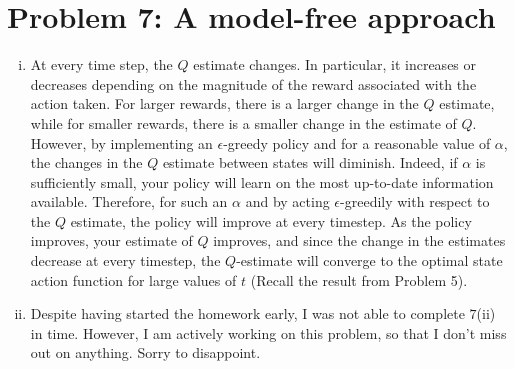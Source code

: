\documentclass[twoside,11pt]{homework}
\DeclarePairedDelimiter{\2norm}{\lVert}{\rVert^2_2}
\newcommand{\1}[1]{\mathds{1}\left[#1\right]}
\begin{document}
\section*{\large Problem 7: A model-free approach}
\begin{enumerate}[i)]
\item At every time step, the $Q$ estimate changes. In particular, it increases or decreases depending on the magnitude of the reward associated with the action taken. For larger rewards, there is a larger change in the $Q$ estimate, while for smaller rewards, there is a smaller change in the  estimate of $Q$. However, by implementing an $\epsilon$-greedy policy and for a reasonable value of $\alpha$, the changes in the $Q$ estimate between states will diminish. Indeed, if $\alpha$ is sufficiently small, your policy will learn on the most up-to-date information available. Therefore, for such an $\alpha$ and by acting $\epsilon$-greedily with respect to the $Q$ estimate, the policy will improve at every timestep. As the policy improves, your estimate of $Q$ improves, and since the change in the estimates decrease at every timestep, the $Q$-estimate will converge to the optimal state action function for large values of $t$ (Recall the result from Problem 5).

\item Despite having started the homework early, I was not able to complete $7$(ii) in time. However, I am actively working on this problem, so that I don't miss out on anything. Sorry to disappoint. 
\end{enumerate}
\end{document}
